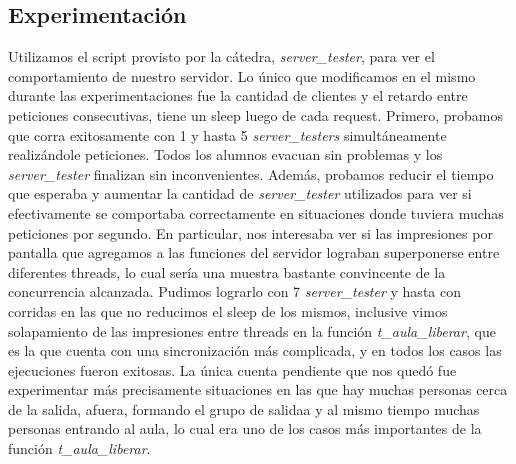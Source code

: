 \subsection{Experimentación}
Utilizamos el script provisto por la cátedra, \textit{server\_tester}, para ver el
comportamiento de nuestro servidor. Lo único que modificamos en el mismo durante las
experimentaciones fue la cantidad de clientes y el retardo entre peticiones consecutivas,
tiene un sleep luego de cada request. Primero, probamos que corra exitosamente con 1 y hasta
5 \textit{server\_testers} simultáneamente realizándole peticiones. Todos los alumnos
evacuan sin problemas y los \textit{server\_tester} finalizan sin inconvenientes. Además,
probamos reducir el tiempo que esperaba y aumentar la cantidad de \textit{server\_tester}
utilizados para ver si efectivamente se comportaba correctamente en situaciones
donde tuviera muchas peticiones por segundo. En particular, nos interesaba ver si
las impresiones por pantalla que agregamos a las funciones del servidor lograban
superponerse entre diferentes threads, lo cual sería una muestra bastante convincente de 
la concurrencia alcanzada. Pudimos lograrlo con 7 \textit{server\_tester} y hasta con
corridas en las que no reducimos el sleep de los mismos, inclusive vimos solapamiento
de las impresiones entre threads en la función \textit{t\_aula\_liberar}, que es la 
que cuenta con una sincronización más complicada, y en todos los casos las ejecuciones
fueron exitosas. La única cuenta pendiente que nos quedó fue experimentar más precisamente
situaciones en las que hay muchas personas cerca de la salida, afuera, formando el grupo
de salidaa y al mismo tiempo muchas personas entrando al aula, lo cual era uno de los
casos más importantes de la función \textit{t\_aula\_liberar}.


